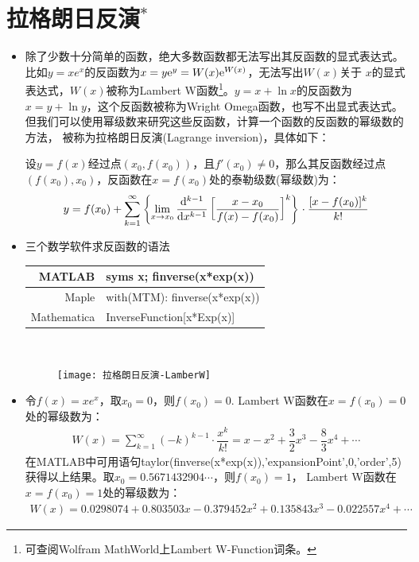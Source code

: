 \section{拉格朗日反演$ ^* $}
\begin{itemize}[leftmargin=\inteval{\myitemleftmargin}pt,itemsep=
   \inteval{\myitemitempsep}pt,topsep=\inteval{\myitemtopsep}pt]
\item 除了少数十分简单的函数，绝大多数函数都无法写出其反函数的显式表达式。
比如$ y=xe^x $的反函数为$ x=y\mathrm{e}^{y}=W(x)\mathrm{e}^{W(x)} $，无法写出$ W(x) $关于
$ x $的显式表达式，$ W(x) $被称为Lambert W函数\footnote{
可查阅Wolfram MathWorld上Lambert W-Function词条。}。$ y=x+\ln x $的反函数为
$ x=y+\ln y $，这个反函数被称为Wright Omega函数，也写不出显式表达式。
但我们可以使用幂级数来研究这些反函数，计算一个函数的反函数的幂级数的方法，
被称为拉格朗日反演(Lagrange inversion)，具体如下：

设$ y=f(x) $经过点$ (x_0,f(x_0)) $，且$ f'(x_0)\neq 0 $，那么其反函数经过点
$ (f(x_0),x_0) $，反函数在$ x=f(x_0) $处的泰勒级数(幂级数)为：
\begin{gather}\label{拉格朗日反演公式}
    y=f(x_0)+\sum_{k=1}^{\infty}\left\{\lim_{x\to x_0}\dfrac{\mathrm{d}^{k-1}}{\mathrm{d} x^{k-1}}
    \left[\dfrac{x-x_0}{f(x)-f(x_0)}\right]^k\right\}\cdot 
    \dfrac{[x-f(x_0)]^k}{k!}
\end{gather}

\item 三个数学软件求反函数的语法 
\begin{table}[!htbp]
\centering
\begin{tabular}{|r|l|}
    \hline
    MATLAB & syms x; finverse(x*exp(x)) \\ \hline
    Maple & with(MTM): finverse(x*exp(x)) \\ \hline
    Mathematica & InverseFunction[x*Exp(x)] \\ \hline
\end{tabular}
\end{table} \\

\begin{figure}[!htbp]
    \centering
    \texttt{[image: 拉格朗日反演-LamberW]}
\end{figure}
\item 令$ f(x)=xe^x $，取$ x_0=0 $，则$ f(x_0)=0 $.
Lambert W函数在$ x=f(x_0)=0 $处的幂级数为：
\begin{gather}\label{LambertW拉格朗日反演x=0}
    W(x)=\sum_{k=1}^{\infty}(-k)^{k-1}\cdot \dfrac{x^k}{k!}
    =x-x^2+\dfrac{3}{2}x^3-\dfrac{8}{3}x^4+\cdots 
\end{gather}
在MATLAB中可用语句taylor(finverse(x*exp(x)),'expansionPoint',0,'order',5)
获得以上结果。取$ x_0=0.5671432904\cdots $，则$ f(x_0)=1 $，
Lambert W函数在$ x=f(x_0)=1 $处的幂级数为：
\begin{gather}\label{LambertW拉格朗日反演x=1}
    W(x)=0.0298074 + 0.803503x - 0.379452x^2 + 0.135843x^3 - 0.022557x^4+\cdots
\end{gather}


\end{itemize}
